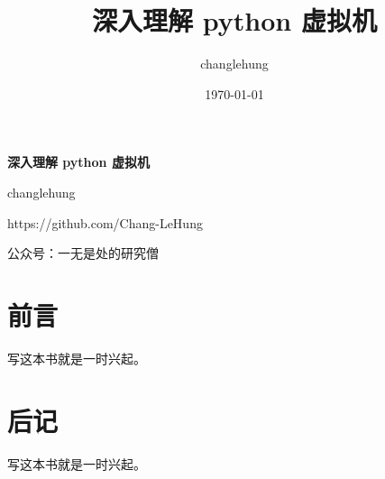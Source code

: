 \documentclass[11pt]{book}
\title{\textbf{深入理解 python 虚拟机}}
\author{changlehung \affil{单位1}}
\date{\today}
\theoremstyle{mytheoremstyle}
\begin{document}
\begin{titlepage}
    \begin{center}
        \vspace{3cm}
        {\Huge\textbf{深入理解 python 虚拟机}}
        
        \vspace{1cm}
        {\Large{changlehung}}
        
        \vspace{1cm}
        {\large{https://github.com/Chang-LeHung}}
    
        \vspace{3cm}
        {\Large{公众号：一无是处的研究僧}}
    \end{center}
\end{titlepage}



\tableofcontents

\frontmatter %

\chapter{前言}
写这本书就是一时兴起。

\mainmatter %



\backmatter %

\chapter{后记}
写这本书就是一时兴起。
\end{document}
